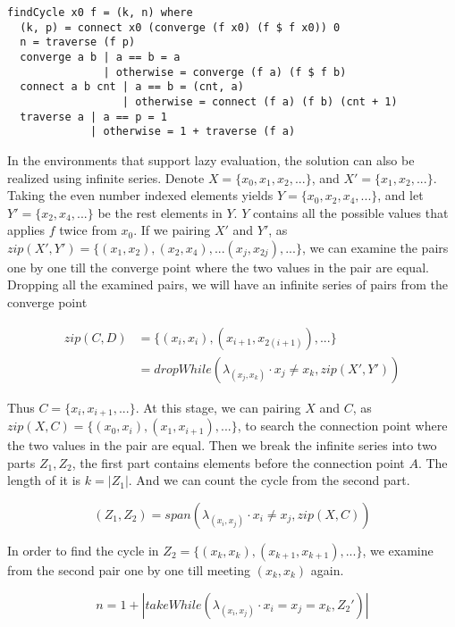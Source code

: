 \documentclass{article}
\begin{document}
\lstset{language=Haskell}
\begin{lstlisting}
findCycle x0 f = (k, n) where
  (k, p) = connect x0 (converge (f x0) (f $ f x0)) 0
  n = traverse (f p)
  converge a b | a == b = a
               | otherwise = converge (f a) (f $ f b)
  connect a b cnt | a == b = (cnt, a)
                  | otherwise = connect (f a) (f b) (cnt + 1)
  traverse a | a == p = 1
             | otherwise = 1 + traverse (f a)
\end{lstlisting}

In the environments that support lazy evaluation, the solution can also be realized using infinite series.
Denote $X = \{x_0, x_1, x_2, ...\}$, and $X' = \{ x_1, x_2, ...\}$.
Taking the even number indexed elements yields $Y = \{x_0, x_2, x_4, ...\}$, and let $Y' = \{x_2, x_4, ...\}$
be the rest elements in $Y$. $Y$ contains all the possible values that applies $f$ twice from $x_0$.
If we pairing $X'$ and $Y'$, as $zip(X', Y') = \{(x_1, x_2), (x_2, x_4), ... (x_j, x_{2j}), ...\}$,
we can examine the pairs one by one till the converge point where the two values in the pair are equal.
Dropping all the examined pairs, we will have an infinite series of pairs from the converge point

\begin{equation}
\begin{array}{rl}
zip(C, D) & = \{(x_i, x_i), (x_{i+1}, x_{2(i+1)}), ...\} \\
  & = dropWhile(\lambda_{(x_j, x_k)} \cdot x_j \neq x_k, zip(X', Y'))
\end{array}
\end{equation}

Thus $C = \{x_i, x_{i+1}, ...\}$. At this stage, we can pairing $X$ and $C$, as
$zip(X, C) = \{(x_0, x_i), (x_1, x_{i+1}), ...\}$, to search the connection point
where the two values in the pair are equal. Then
we break the infinite series into two parts $Z_1, Z_2$, the first part contains elements before the
connection point $A$. The length of it is $k = |Z_1|$. And we can count the cycle from the second part.

\begin{equation}
(Z_1, Z_2) = span(\lambda_{(x_i, x_j)} \cdot x_i \neq x_j, zip(X, C))
\end{equation}

In order to find the cycle in $Z_2 = \{(x_k, x_k), (x_{k+1}, x_{k+1}), ...\}$, we examine from the second
pair one by one till meeting $(x_k, x_k)$ again.

\begin{equation}
n = 1 + |takeWhile(\lambda_{(x_i, x_j)} \cdot x_i = x_j = x_k, Z_2')|
\end{equation}
\end{document}
